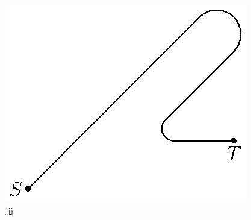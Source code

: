 \documentclass{article}
\begin{document}
\begin{figure}
\centering
\includegraphics[viewport=234 339 377 452,clip]{nonhol.eps}
\caption{jjj}
\end{figure}
\end{document}
